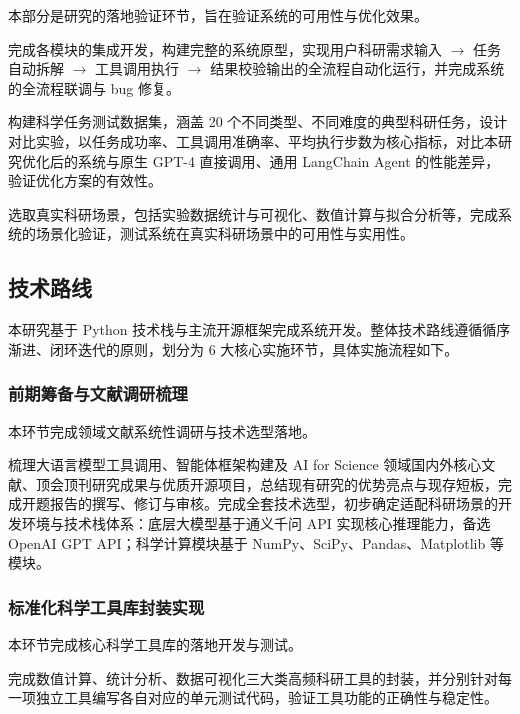 本部分是研究的落地验证环节，旨在验证系统的可用性与优化效果。

完成各模块的集成开发，构建完整的系统原型，实现用户科研需求输入 $\to$ 任务自动拆解 $\to$ 工具调用执行 $\to$ 结果校验输出的全流程自动化运行，并完成系统的全流程联调与 bug 修复。

构建科学任务测试数据集，涵盖 20 个不同类型、不同难度的典型科研任务，设计对比实验，以任务成功率、工具调用准确率、平均执行步数为核心指标，对比本研究优化后的系统与原生 GPT-4 直接调用\cite{openai2023gpt4}、通用 LangChain Agent\cite{langchain2023} 的性能差异，验证优化方案的有效性。

选取真实科研场景，包括实验数据统计与可视化、数值计算与拟合分析等，完成系统的场景化验证，测试系统在真实科研场景中的可用性与实用性。

\subsection{技术路线}

本研究基于 Python 技术栈与主流开源框架完成系统开发。整体技术路线遵循循序渐进、闭环迭代的原则，划分为 6 大核心实施环节，具体实施流程如下。

\subsubsection{前期筹备与文献调研梳理}

本环节完成领域文献系统性调研与技术选型落地。

梳理大语言模型工具调用、智能体框架构建及 AI for Science 领域国内外核心文献、顶会顶刊研究成果与优质开源项目\cite{brown2020gpt3,yao2023react,schick2023toolformer,jumper2021alphafold}，总结现有研究的优势亮点与现存短板，完成开题报告的撰写、修订与审核。完成全套技术选型，初步确定适配科研场景的开发环境与技术栈体系：底层大模型基于通义千问 API 实现核心推理能力，备选 OpenAI GPT API\cite{openai2023gpt4}；科学计算模块基于 NumPy、SciPy、Pandas、Matplotlib 等模块\cite{harris2020numpy,virtanen2020scipy,mckinney2010pandas}。

\subsubsection{标准化科学工具库封装实现}

本环节完成核心科学工具库的落地开发与测试。

完成数值计算、统计分析、数据可视化三大类高频科研工具的封装，并分别针对每一项独立工具编写各自对应的单元测试代码，验证工具功能的正确性与稳定性。

